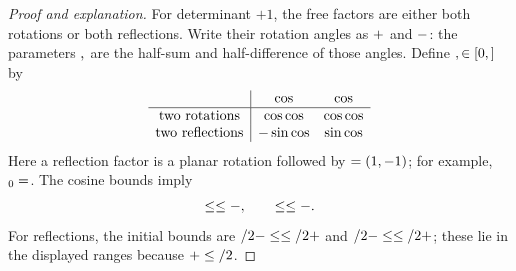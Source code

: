 \begin{proof}[Proof and explanation]
For determinant $+1$, the free factors are either both rotations or both
reflections. Write their rotation angles as
$\sym{PairRotationR}+\sym{PairRotationS}$ and
$\sym{PairRotationR}-\sym{PairRotationS}$: the parameters
$\sym{PairRotationR},\sym{PairRotationS}$ are the half-sum and half-difference
of those angles. Define $\sym{PairPhaseX},\sym{PairPhaseY}\in[0,\sym{PiConstant}]$ by
\[
 \begin{array}{c|cc}
  &\cos\sym{PairPhaseX}&\cos\sym{PairPhaseY}\\ \hline
  \text{two rotations}
    &\cos\sym{PairMeanAngle}\cos\sym{PairRotationS}
    &\cos\sym{PairHalfDifference}\cos\sym{PairRotationR}\\
  \text{two reflections}
    &-\sin\sym{PairHalfDifference}\cos\sym{PairRotationR}
    &\sin\sym{PairMeanAngle}\cos\sym{PairRotationS}
 \end{array}
\]
Here a reflection factor is a planar rotation followed by
$\sym{PairPlanarReflection}=\sym{DiagonalOperator}(1,-1)$; for example,
$\like{PairFreeOrthogonal}{\symglyph{PairFreeOrthogonal}_0}
 =\sym{MatchingPlanarRotationSum}\sym{PairPlanarReflection}$.
The cosine bounds imply
\[
 \sym{PairMeanAngle}\le \sym{PairPhaseX}\le\sym{PiConstant}-\sym{PairMeanAngle},\qquad
 \sym{PairHalfDifference}\le \sym{PairPhaseY}\le\sym{PiConstant}-\sym{PairHalfDifference}.
\]
For reflections, the initial bounds are
$\sym{PiConstant}/2-\sym{PairHalfDifference}\le\sym{PairPhaseX}\le\sym{PiConstant}/2+\sym{PairHalfDifference}$
and $\sym{PiConstant}/2-\sym{PairMeanAngle}\le\sym{PairPhaseY}\le\sym{PiConstant}/2+\sym{PairMeanAngle}$;
these lie in the displayed ranges because
$\sym{PairMeanAngle}+\sym{PairHalfDifference}\le\sym{PiConstant}/2$.


\end{proof}
